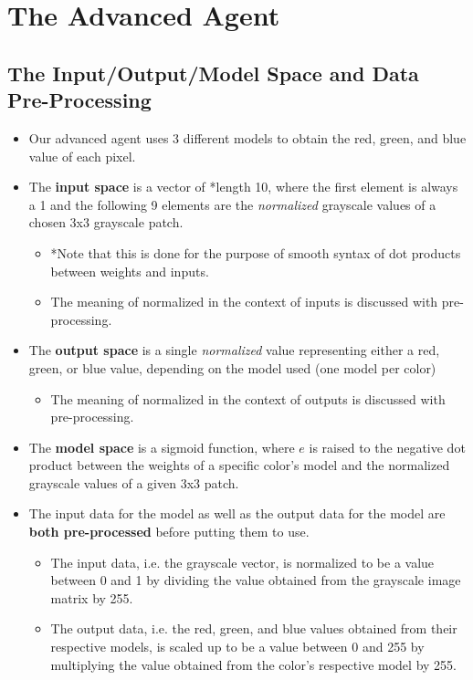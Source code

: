 \documentclass[11pt]{article}
\begin{document}
\section{The Advanced Agent}
\subsection{The Input/Output/Model Space and Data Pre-Processing}
\begin{itemize}
\item Our advanced agent uses 3 different models to obtain the red, green, and blue value of each pixel.
\item The \textbf{input space} is a vector of *length 10, where the first element is always a 1 and the following 9 elements are the \textit{normalized} grayscale values of a chosen 3x3 grayscale patch.
\begin{itemize}
\item *Note that this is done for the purpose of smooth syntax of dot products between weights and inputs.
\item The meaning of normalized in the context of inputs is discussed with pre-processing.
\end{itemize}
\item The \textbf{output space} is a single \textit{normalized} value representing either a red, green, or blue value, depending on the model used (one model per color)
\begin{itemize}
\item The meaning of normalized in the context of outputs is discussed with pre-processing.
\end{itemize}
\item The \textbf{model space} is a sigmoid function, where $e$ is raised to the negative dot product between the weights of a specific color's model and the normalized grayscale values of a given 3x3 patch. 
\item The input data for the model as well as the output data for the model are \textbf{both pre-processed} before putting them to use.
\begin{itemize}
\item The input data, i.e. the grayscale vector, is normalized to be a value between 0 and 1 by dividing the value obtained from the grayscale image matrix by 255.
\item The output data, i.e. the red, green, and blue values obtained from their respective models, is scaled up to be a value between 0 and 255 by multiplying the value obtained from the color's respective model by 255.
\end{itemize}
\end{itemize}
\end{document}

